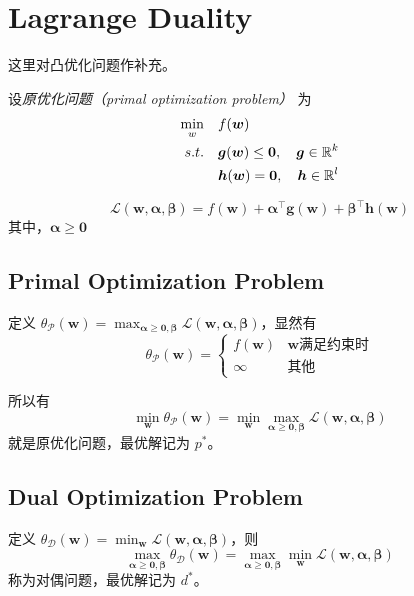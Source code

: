 \section{Lagrange Duality}
	这里对凸优化问题作补充。
	
	设\emph{原优化问题（primal optimization problem）} 为
	\begin{align*}
	\min_w\quad & f(\bm{w}) \\
	s.t. \quad & \bm{g}(\bm{w}) \leq \bm{0}, \quad \bm{g} \in \mathbb{R}^k \\
	& \bm{h}(\bm{w}) = \bm{0}, \quad \bm{h} \in \mathbb{R}^l
	\end{align*}
	
	\begin{df}
		\begin{equation}
		\mathcal{L}(\bm{w}, \bm{\alpha}, \bm{\beta}) = f(\bm{w}) + \bm{\alpha}^\intercal \bm{g}(\bm{w}) + \bm{\beta}^\intercal \bm{h}(\bm{w})
		\end{equation}
		其中，$ \bm{\alpha} \geq \bm{0} $
	\end{df}
	
	\subsection{Primal Optimization Problem}
		定义 $ \theta_\mathcal{P}(\bm{w}) = \max_{\bm{\alpha} \geq \bm{0}, \bm{\beta}}{\mathcal{L}(\bm{w}, \bm{\alpha}, \bm{\beta})} $，显然有
		\begin{equation*}
		\theta_\mathcal{P}(\bm{w}) = 
		\begin{cases}
		f(\bm{w}) & \bm{w} \text{满足约束时} \\
		\infty & \text{其他}
		\end{cases}
		\end{equation*}
		
		所以有
		\begin{equation}
		\min_{\bm{w}}{\theta_\mathcal{P}(\bm{w})} = \min_{\bm{w}}{\max_{\bm{\alpha} \geq \bm{0}, \bm{\beta}}{\mathcal{L}(\bm{w}, \bm{\alpha}, \bm{\beta})}}
		\end{equation}
		就是原优化问题，最优解记为 $ p^* $。
		
	\subsection{Dual Optimization Problem}
		定义 $ \theta_\mathcal{D}(\bm{w}) = \min_{\bm{w}}{\mathcal{L}(\bm{w}, \bm{\alpha}, \bm{\beta})} $，则
		\begin{equation}
		\max_{\bm{\alpha} \geq \bm{0}, \bm{\beta}}{\theta_\mathcal{D}(\bm{w})} = \max_{\bm{\alpha} \geq \bm{0}, \bm{\beta}}\min_{\bm{w}}{\mathcal{L}(\bm{w}, \bm{\alpha}, \bm{\beta})} \label{dual-opt-problem}
		\end{equation}
		称为对偶问题，最优解记为 $ d^* $。
		
